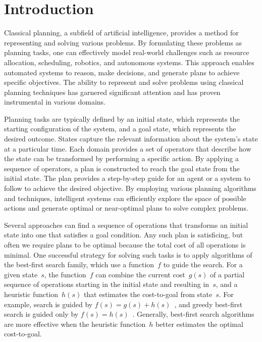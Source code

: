 \chapter{Introduction}
\label{sec:intro}

Classical planning, a subfield of artificial intelligence, provides a method for representing and solving various problems. By formulating these problems as planning tasks, one can effectively model real-world challenges such as resource allocation, scheduling, robotics, and autonomous systems. This approach enables automated systems to reason, make decisions, and generate plans to achieve specific objectives. The ability to represent and solve problems using classical planning techniques has garnered significant attention and has proven instrumental in various domains.

Planning tasks are typically defined by an initial state, which represents the starting configuration of the system, and a goal state, which represents the desired outcome. States capture the relevant information about the system's state at a particular time. Each domain provides a set of operators that describe how the state can be transformed by performing a specific action. By applying a sequence of operators, a plan is constructed to reach the goal state from the initial state. The plan provides a step-by-step guide for an agent or a system to follow to achieve the desired objective. By employing various planning algorithms and techniques, intelligent systems can efficiently explore the space of possible actions and generate optimal or near-optimal plans to solve complex problems.

Several approaches can find a sequence of operations that transforms an initial state into one that satisfies a goal condition. Any such plan is satisficing, but often we require plans to be optimal because the total cost of all operations is minimal. One successful strategy for solving such tasks is to apply algorithms of the best-first search family, which use a function~$f$ to guide the search. For a given state~$s$, the function~$f$ can combine the current cost~$g(s)$ of a partial sequence of operations starting in the initial state and resulting in~$s$, and a heuristic function~$h(s)$ that estimates the cost-to-goal from state~$s$. For example, \astar search is guided by $f(s)=g(s)+h(s)$~\cite{hart-et-al-ieeessc1968}, and greedy best-first search is guided only by $f(s)=h(s)$~\cite{doran-michie-rsl1966}. Generally, best-first search algorithms are more effective when the heuristic function~$h$ better estimates the optimal cost-to-goal.

